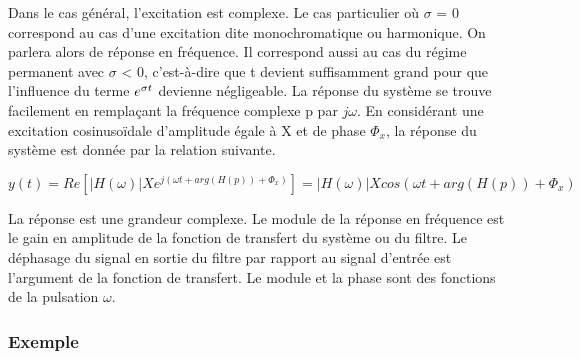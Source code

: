 \begin{remark}{}
	Dans le cas général, l'excitation est complexe. Le cas
        particulier où $\sigma$ = 0 correspond au cas d'une excitation
        dite monochromatique ou harmonique. On parlera alors de
        réponse en fréquence. Il correspond aussi au cas du régime
        permanent avec $\sigma$ < 0, c'est-à-dire que t devient
        suffisamment grand pour que l'influence du terme
        $e^{\sigma t}$ devienne négligeable.  La réponse du système se
        trouve facilement en remplaçant la fréquence complexe p par
        $j\omega$. En considérant une excitation cosinusoïdale
        d'amplitude égale à X et de phase $\Phi_{x}$, la réponse du
        système est donnée par la relation suivante.
	
	\begin{equation}\label{calcul_reponse_fonction_transfert}
          y(t) = Re[|H(\omega)|X e^{j(\omega t+arg(H(p))+\Phi_{x})}] =|H(\omega)|X cos(\omega t+arg(H(p))+\Phi_{x})
	\end{equation}
	
	La réponse est une grandeur complexe. Le module de la réponse
        en fréquence est le gain en amplitude de la fonction de
        transfert du système ou du filtre. Le déphasage du signal en
        sortie du filtre par rapport au signal d'entrée est l'argument
        de la fonction de transfert. Le module et la phase sont des
        fonctions de la pulsation $\omega$.
	
	
	\subsubsection{Exemple}
	

\end{remark}
